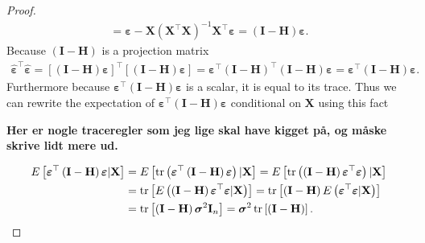 \begin{proof}
\begin{align*}
        = \boldsymbol{\varepsilon} - \mathbf{X}\left(\mathbf{X}^\top\mathbf{X}\right)^{-1}\mathbf{X}^\top\boldsymbol{\varepsilon} = \left(\mathbf{I} - \mathbf{H}\right)\boldsymbol{\varepsilon}.
    \end{align*}
    Because $\left(\mathbf{I} - \mathbf{H}\right)$ is a projection matrix
    \begin{align*}
        \boldsymbol{\hat{\varepsilon}}^\top\boldsymbol{\hat{\varepsilon}} = \left[  \left(\mathbf{I} - \mathbf{H}\right)\boldsymbol{\varepsilon} \right]^\top\left[ \left(\mathbf{I} - \mathbf{H}\right)\boldsymbol{\varepsilon} \right] = \boldsymbol{\varepsilon}^\top\left(\mathbf{I} - \mathbf{H}\right)^\top \left(\mathbf{I} - \mathbf{H}\right)\boldsymbol{\varepsilon} = \boldsymbol{\varepsilon}^\top \left(\mathbf{I} - \mathbf{H}\right)\boldsymbol{\varepsilon}.
    \end{align*}
    Furthermore because $\boldsymbol{\varepsilon}^\top \left(\mathbf{I} - \mathbf{H}\right)\boldsymbol{\varepsilon}$ is a scalar, it is equal to its trace.
    Thus we can rewrite the expectation of $\boldsymbol{\varepsilon}^\top \left(\mathbf{I} - \mathbf{H}\right)\boldsymbol{\varepsilon}$ conditional on $\mathbf{X}$ using this fact
    \begin{center}
        \titlerule
        \Large{\textbf{Her er nogle traceregler som jeg lige skal have kigget på, og måske skrive lidt mere ud.}}
        \titlerule
    \end{center}
    \begin{align}
        E\left[\boldsymbol{\varepsilon}^\top \left(\mathbf{I} - \mathbf{H}\right)\boldsymbol{\varepsilon}|\mathbf{X}\right] &= E\left[\operatorname{\text{tr}}\left(\boldsymbol{\varepsilon}^\top \left(\mathbf{I} - \mathbf{H}\right)\boldsymbol{\varepsilon}\right)|\mathbf{X}\right] 
        = E\left[\operatorname{\text{tr}}\left(\left(\mathbf{I} - \mathbf{H}\right)\boldsymbol{\varepsilon}^\top\boldsymbol{\varepsilon}\right)|\mathbf{X}\right] \nonumber\\
        &= \operatorname{\text{tr}}\left[E\left(\left(\mathbf{I} - \mathbf{H}\right)\boldsymbol{\varepsilon}^\top\boldsymbol{\varepsilon}|\mathbf{X}\right)\right] 
        = \operatorname{\text{tr}}\left[\left(\mathbf{I} - \mathbf{H}\right)E\left(\boldsymbol{\varepsilon}^\top\boldsymbol{\varepsilon}|\mathbf{X}\right)\right] \nonumber\\
        &= \operatorname{\text{tr}}\left[\left(\mathbf{I} - \mathbf{H}\right)\boldsymbol{\sigma}^2\mathbf{I}_{n}\right]
        = \boldsymbol{\sigma}^2\operatorname{\text{tr}}\left[\left(\mathbf{I} - \mathbf{H}\right)\right]. \label{eq:trace_projection_matrix}
    \end{align}

\end{proof}
